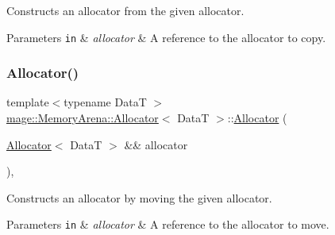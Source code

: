 Constructs an allocator from the given allocator.


\begin{DoxyParams}[1]{Parameters}
\mbox{\tt in}  & {\em allocator} & A reference to the allocator to copy. \\
\hline
\end{DoxyParams}
\hypertarget{classmage_1_1_memory_arena_1_1_allocator_a54ddc035b0987d71776c54a1240be18d}{}\label{classmage_1_1_memory_arena_1_1_allocator_a54ddc035b0987d71776c54a1240be18d} 
\subsubsection{\texorpdfstring{Allocator()}{Allocator()}\hspace{0.1cm}{\footnotesize\ttfamily [2/4]}}
{\footnotesize\ttfamily template$<$typename DataT $>$ \\
\hyperlink{classmage_1_1_memory_arena_1_1_allocator}{mage\+::\+Memory\+Arena\+::\+Allocator}$<$ DataT $>$\+::\hyperlink{classmage_1_1_memory_arena_1_1_allocator}{Allocator} (\begin{DoxyParamCaption}\item[{\hyperlink{classmage_1_1_memory_arena_1_1_allocator}{Allocator}$<$ DataT $>$ \&\&}]{allocator }\end{DoxyParamCaption})\hspace{0.3cm}{\ttfamily [default]}, {\ttfamily [noexcept]}}

Constructs an allocator by moving the given allocator.


\begin{DoxyParams}[1]{Parameters}
\mbox{\tt in}  & {\em allocator} & A reference to the allocator to move. \\
\hline
\end{DoxyParams}
\hypertarget{classmage_1_1_memory_arena_1_1_allocator_a9485ec7437c3c798a37c67631aa7e8ab}{}\label{classmage_1_1_memory_arena_1_1_allocator_a9485ec7437c3c798a37c67631aa7e8ab} 
